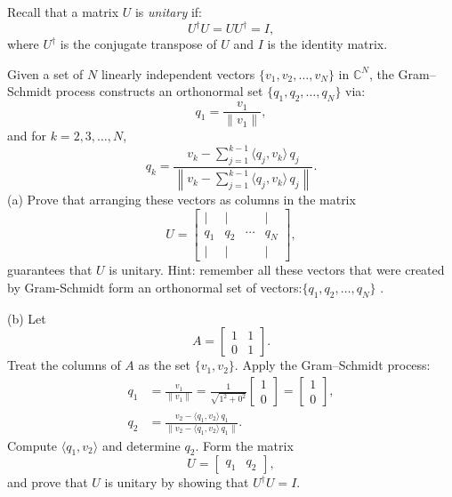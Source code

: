 \documentclass[12pt]{article}
\begin{document}
Recall that a matrix \( U \) is \emph{unitary} if:
\[
U^\dagger U = U U^\dagger = I,
\]
where \( U^\dagger \) is the conjugate transpose of \( U \) and \( I \) is the identity matrix.

\bigskip




    Given a set of \( N \) linearly independent vectors \( \{v_1, v_2, \ldots, v_N\} \) in \( \mathbb{C}^N \), the Gram--Schmidt process constructs an orthonormal set \( \{q_1, q_2, \ldots, q_N\} \) via:
    \[
    q_1 = \frac{v_1}{\|v_1\|},
    \]
    and for \( k = 2, 3, \ldots, N \),
    \[
    q_k = \frac{v_k - \sum_{j=1}^{k-1} \langle q_j, v_k \rangle\, q_j}{\left\| v_k - \sum_{j=1}^{k-1} \langle q_j, v_k \rangle\, q_j \right\|}.
    \]
(a) Prove that arranging these vectors as columns in the matrix
    \[
    U = \begin{bmatrix} | & | & & | \\ q_1 & q_2 & \cdots & q_N \\ | & | & & | \end{bmatrix},
    \]
    guarantees that \( U \) is unitary. Hint: remember all these vectors  that were created by Gram-Schmidt form an orthonormal set of vectors:\( \{q_1, q_2, \ldots, q_N\} \) \smiley{}.



(b) Let
    \[
    A = \begin{bmatrix} 1 & 1 \\ 0 & 1 \end{bmatrix}.
    \]
    Treat the columns of \( A \) as the set \( \{v_1, v_2\} \). Apply the Gram--Schmidt process:
    \begin{align*}
        q_1 &= \frac{v_1}{\|v_1\|} = \frac{1}{\sqrt{1^2+0^2}} \begin{bmatrix} 1 \\ 0 \end{bmatrix} = \begin{bmatrix} 1 \\ 0 \end{bmatrix},\\[1ex]
        q_2 &= \frac{v_2 - \langle q_1, v_2 \rangle\, q_1}{\|v_2 - \langle q_1, v_2 \rangle\, q_1\|}.
    \end{align*}
    Compute \( \langle q_1, v_2 \rangle \) and determine \( q_2 \). Form the matrix
    \[
    U = \begin{bmatrix} q_1 & q_2 \end{bmatrix},
    \]
    and prove that \( U \) is unitary by showing that \( U^\dagger U = I \).
    
\end{document}
